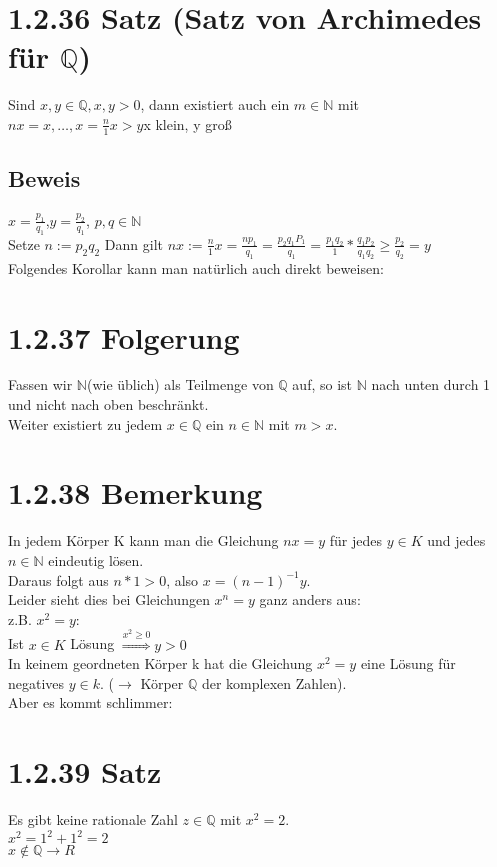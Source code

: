 \documentclass[11pt]{scrartcl}
\begin{document}
\section{1.2.36 Satz (Satz von Archimedes für $\mathbb{Q}$)}
Sind $x,y \in \mathbb{Q}, x,y > 0$, dann existiert auch ein $m \in \mathbb{N}$ mit \\
$nx = x, \dots,x = \frac{n}{1} x > y $x klein, y groß
\subsection*{Beweis}
$x = \frac{p_1}{q_1}$,$y = \frac{p_2}{q_1}$, $p,q \in \mathbb{N}$ \\
Setze $n := p_2 q_2$ Dann gilt $nx := \frac{n}{1} x  = \frac{n p_1}{q_1} = \frac{p_2 q_1 P_1}{q_1} = \frac{p_1 q_2}{1} * \frac{q_1 p_2}{q_1 q_2} \geq \frac{p_2}{q_2} = y$ \\

Folgendes Korollar kann man natürlich auch direkt beweisen:
\section{1.2.37 Folgerung}
Fassen wir $\mathbb{N}$(wie üblich) als Teilmenge von $\mathbb{Q}$
auf, so ist $\mathbb{N}$ nach unten durch 1 und nicht nach oben beschränkt. \\
Weiter existiert zu jedem $x \in \mathbb{Q}$ ein $n \in \mathbb{N}$ mit $m > x$.
\section{1.2.38 Bemerkung}
In jedem Körper K kann man die Gleichung $nx = y
$ für jedes $y \in K$ und jedes $n \in \mathbb{N}$ eindeutig lösen. \\
Daraus folgt aus $n *1 > 0$, also $x = (n-1)^{-1}y$. \\
Leider sieht dies bei Gleichungen $x^n = y$ ganz anders aus: \\
z.B. $x^2 = y$: \\
Ist $x \in K$ Lösung $\overset{x^2 \geq 0}{\Rightarrow} y > 0$ \\
In keinem geordneten Körper k hat die Gleichung $x^2 = y$ eine Lösung für negatives $y \in k$. ($\rightarrow$ Körper $\mathbb{Q}$ der komplexen Zahlen). \\
Aber es kommt schlimmer:
\section{1.2.39 Satz}
Es gibt keine rationale Zahl $z \in \mathbb{Q}$ mit $x^2 = 2$. \\
$x^2 = 1^2 +1^2=2$\\
$x \notin \mathbb{Q} \rightarrow R$
\end{document}
